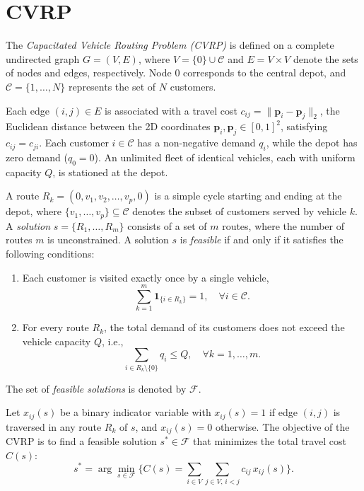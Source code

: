 \documentclass[letterpaper]{article} %
\begin{document}
\section{CVRP}
\label{sec:problem_definition}

The \textit{Capacitated Vehicle Routing Problem (CVRP)} is defined on a complete undirected graph $G = (V, E)$, where $V = \{0\} \cup \mathcal{C}$ and $E = V \times V$ denote the sets of nodes and edges, respectively. Node $0$ corresponds to the central depot, and $\mathcal{C} = \{1, \dots, N\}$ represents the set of $N$ customers.

Each edge $(i, j) \in E$ is associated with a travel cost $c_{ij} = \|\mathbf{p}_i - \mathbf{p}_j\|_2$, the Euclidean distance between the 2D coordinates $\mathbf{p}_i, \mathbf{p}_j \in [0,1]^2$, satisfying $c_{ij} = c_{ji}$. Each customer $i \in \mathcal{C}$ has a non-negative demand $q_i$, while the depot has zero demand ($q_0 = 0$). An unlimited fleet of identical vehicles, each with uniform capacity $Q$, is stationed at the depot.

A route $R_k = (0, v_1, v_2, \ldots, v_p, 0)$ is a simple cycle starting and ending at the depot, where $\{v_1, \ldots, v_p\} \subseteq \mathcal{C}$ denotes the subset of customers served by vehicle $k$. A \textit{solution} $s = \{R_1, \ldots, R_m\}$ consists of a set of $m$ routes, where the number of routes $m$ is unconstrained. A solution $s$ is \textit{feasible} if and only if it satisfies the following conditions:
\begin{enumerate}
    \item Each customer is visited exactly once by a single vehicle,
    $$
    \sum_{k=1}^{m} \mathbf{1}_{\{i \in R_k\}} = 1, \quad \forall i \in \mathcal{C} .
    $$
    \item For every route $R_k$, the total demand of its customers does not exceed the vehicle capacity $Q$, i.e.,
    $$
    \sum_{i \in R_k \setminus \{0\}} q_i \leq Q, \quad \forall k = 1, \ldots, m.
    $$
\end{enumerate}
The set of \textit{feasible solutions} is denoted by $\mathcal{F}$.

Let $x_{ij}(s)$ be a binary indicator variable with $x_{ij}(s) = 1$ if edge $(i,j)$ is traversed in any route $R_k$ of $s$, and $x_{ij}(s) = 0$ otherwise. The objective of the CVRP is to find a feasible solution $s^* \in \mathcal{F}$ that minimizes the total travel cost $C(s)$:
$$
s^* = \arg\min_{s \in \mathcal{F}} \Big\{ C(s) = \sum_{i \in V} \sum_{j \in V,\, i < j} c_{ij}\, x_{ij}(s) \Big\}.
$$
\end{document}
